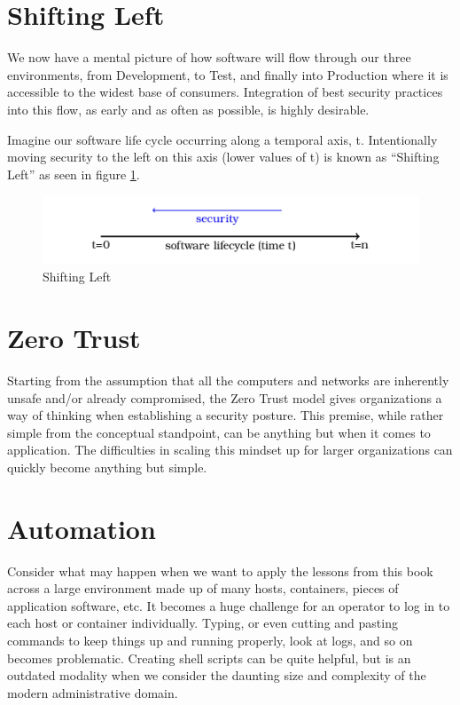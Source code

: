 \section{Shifting Left}

\justifying
We now have a mental picture of how software will flow through our three environments, from
Development, to Test, and finally into Production where it is accessible to the widest
base of consumers. Integration of best security practices into this flow, as early and as often
as possible, is highly desirable.

\justifying
Imagine our software life cycle occurring along a temporal axis, t. Intentionally moving security to the
left on this axis (lower values of t) is known as ``Shifting Left'' as seen
in figure \ref{shift}.

\begin{figure}
\centering
\includegraphics{images/shift_left.png}
\caption{Shifting Left}
\label{shift}
\end{figure}

\section{Zero Trust}

\justifying
Starting from the assumption that all the computers and networks are inherently unsafe and/or already compromised, the
Zero Trust model gives organizations a way of thinking when establishing a security posture.\cite{zerotrust} This premise,
while rather simple from the conceptual standpoint, can be anything but when it comes to application. The difficulties in
scaling this mindset up for larger organizations can quickly become anything but simple.

\section{Automation}

\justifying
Consider what may happen when we want to apply the lessons from this book across a large environment made up of many hosts,
containers, pieces of application software, etc. It becomes a huge challenge for an operator to log in to each host or container
individually. Typing, or even cutting and pasting commands to keep things up and running properly, look at logs,
and so on becomes problematic. Creating shell scripts can be quite helpful, but is an outdated modality when we consider
the daunting size and complexity of the modern administrative domain.

